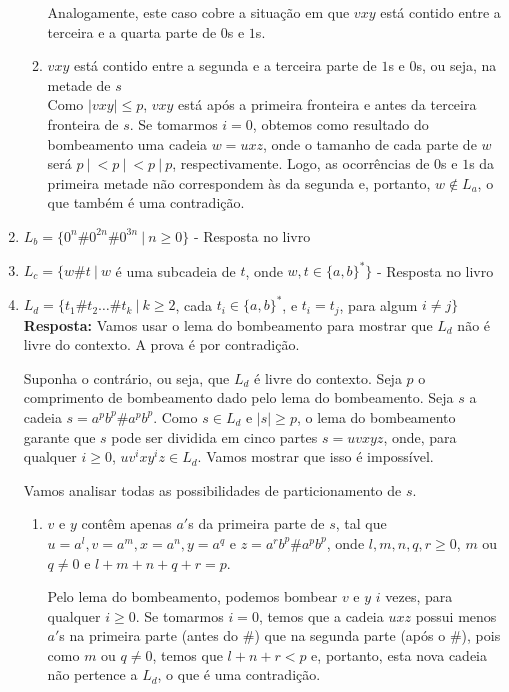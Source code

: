 \begin{enumerate}[label={\textbf{\alph*.}}]
\begin{enumerate}[label={\textbf{Caso \arabic*:}}]
        Analogamente, este caso cobre a situação em que $vxy$ está contido entre a terceira e a quarta parte de $0$s e $1$s.
        
        \item $vxy$ está contido entre a segunda e a terceira parte de $1$s e $0$s, ou seja, na metade de $s$\\[2pt]
        Como $|vxy| \leq p$, $vxy$ está após a primeira fronteira e antes da terceira fronteira de $s$. Se tomarmos $i = 0$, obtemos como resultado do bombeamento uma cadeia $w = uxz$, onde o tamanho de cada parte de $w$ será $p\ |\ <p\ |\ <p\ |\ p$, respectivamente. Logo, as ocorrências de $0$s e $1$s da primeira metade não correspondem às da segunda e, portanto, $w \notin L_a$, o que também é uma contradição.
    \end{enumerate}
    
    \item $L_b = \{0^n\#0^{2n}\#0^{3n} \ |\ n \geq 0\}$ - Resposta no livro
    
    \item $L_c = \{w\#t \ |\ w$ é uma subcadeia de $t$, onde $w, t \in \{a, b\}^*\}$ - Resposta no livro
    
    \item $L_d = \{t_1\#t_2 \ldots \#t_k \ |\ k \geq 2$, cada $t_i \in \{a, b\}^*$, e $t_i = t_j$, para algum $i\neq j\}$\\[3pt]
    \textbf{Resposta:} Vamos usar o lema do bombeamento para mostrar que $L_d$ não é livre do contexto. A prova é por contradição.
    
    Suponha o contrário, ou seja, que $L_d$ é livre do contexto. Seja $p$ o comprimento de bombeamento dado pelo lema do bombeamento. Seja $s$ a cadeia $s = a^pb^p\#a^pb^p$. Como $s \in L_d$ e $|s| \geq p$, o lema do bombeamento garante que $s$ pode ser dividida em cinco partes $s = uvxyz$, onde, para qualquer $i \geq 0$, $uv^ixy^iz \in L_d$. Vamos mostrar que isso é impossível.
    
    Vamos analisar todas as possibilidades de particionamento de $s$.
    
    \begin{enumerate}[label={\textbf{Caso \arabic*:}}]
        \item $v$ e $y$ contêm apenas $a'$s da primeira parte de $s$, tal que $u = a^l, v = a^m, x = a^n, y = a^q$ e $z = a^rb^p\#a^pb^p$, onde $l, m, n, q, r \geq 0$, $m$ ou $q \neq 0$ e $l + m + n + q + r = p$.
        
        Pelo lema do bombeamento, podemos bombear $v$ e $y$ $i$ vezes, para qualquer $i \geq 0$. Se tomarmos $i = 0$, temos que a cadeia $uxz$ possui menos $a'$s na primeira parte (antes do $\#$) que na segunda parte (após o $\#$), pois como $m$ ou $q \neq 0$, temos que $l + n + r < p$ e, portanto, esta nova cadeia não pertence a $L_d$, o que é uma contradição.
        

\end{enumerate}
\end{enumerate}
